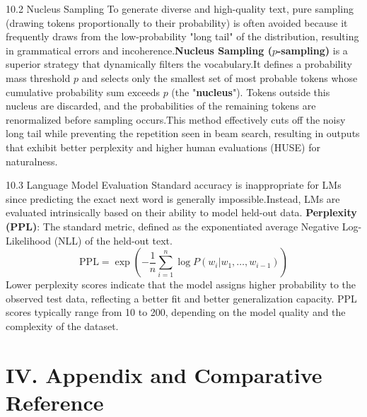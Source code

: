 \documentclass{article}
\begin{document}
10.2 Nucleus Sampling
To generate diverse and high-quality text, pure sampling (drawing tokens proportionally to their probability) is often avoided because it frequently draws from the low-probability "long tail" of the distribution, resulting in grammatical errors and incoherence.\footnotemark[1]
\textbf{Nucleus Sampling ($p$-sampling)} is a superior strategy that dynamically filters the vocabulary.\footnotemark[1] It defines a probability mass threshold $p$ and selects only the smallest set of most probable tokens whose cumulative probability sum exceeds $p$ (the "\textbf{nucleus}"). Tokens outside this nucleus are discarded, and the probabilities of the remaining tokens are renormalized before sampling occurs.\footnotemark[1] This method effectively cuts off the noisy long tail while preventing the repetition seen in beam search, resulting in outputs that exhibit better perplexity and higher human evaluations (HUSE) for naturalness.\footnotemark[1]

10.3 Language Model Evaluation
Standard accuracy is inappropriate for LMs since predicting the exact next word is generally impossible.\footnotemark[1] Instead, LMs are evaluated intrinsically based on their ability to model held-out data.
\textbf{Perplexity (PPL)}: The standard metric, defined as the exponentiated average Negative Log-Likelihood (NLL) of the held-out text.\footnotemark[1]
$$\text{PPL} = \exp\left(-\frac{1}{n} \sum_{i=1}^{n} \log P(w_i|w_1, \ldots, w_{i-1})\right)$$
Lower perplexity scores indicate that the model assigns higher probability to the observed test data, reflecting a better fit and better generalization capacity. PPL scores typically range from 10 to 200, depending on the model quality and the complexity of the dataset.\footnotemark[1]

\part{IV. Appendix and Comparative Reference}
\end{document}
